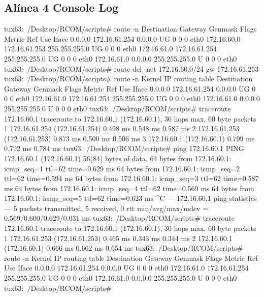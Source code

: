 \documentclass[11pt,a4paper,reqno]{report}
\numberwithin{equation}{section}
\begin{document}
\begin{appendices}
\subsection{Alínea 4 Console Log}
\label{ex4_redirect}
\begin{boxedverbatim}
tux63:~/Desktop/RCOM/scripts# route -n
Destination     Gateway         Genmask         Flags Metric Ref    Use Iface
0.0.0.0         172.16.61.254   0.0.0.0         UG    0      0        0 eth0
172.16.60.0     172.16.61.253   255.255.255.0   UG    0      0        0 eth0
172.16.61.0     172.16.61.254   255.255.255.0   UG    0      0        0 eth0
172.16.61.0     0.0.0.0         255.255.255.0   U     0      0        0 eth0
tux63:~/Desktop/RCOM/scripts# route del -net 172.16.60.0/24 gw 172.16.61.253
tux63:~/Desktop/RCOM/scripts# route -n
Kernel IP routing table
Destination     Gateway         Genmask         Flags Metric Ref    Use Iface
0.0.0.0         172.16.61.254   0.0.0.0         UG    0      0        0 eth0
172.16.61.0     172.16.61.254   255.255.255.0   UG    0      0        0 eth0
172.16.61.0     0.0.0.0         255.255.255.0   U     0      0        0 eth0
tux63:~/Desktop/RCOM/scripts# traceroute 172.16.60.1
traceroute to 172.16.60.1 (172.16.60.1), 30 hops max, 60 byte packets
 1  172.16.61.254 (172.16.61.254)  0.498 ms  0.548 ms  0.587 ms
 2  172.16.61.253 (172.16.61.253)  0.873 ms  0.500 ms  0.506 ms
 3  172.16.60.1 (172.16.60.1)  0.799 ms  0.792 ms  0.784 ms
tux63:~/Desktop/RCOM/scripts# ping 172.16.60.1
PING 172.16.60.1 (172.16.60.1) 56(84) bytes of data.
64 bytes from 172.16.60.1: icmp_seq=1 ttl=62 time=0.629 ms
64 bytes from 172.16.60.1: icmp_seq=2 ttl=62 time=0.594 ms
64 bytes from 172.16.60.1: icmp_seq=3 ttl=62 time=0.587 ms
64 bytes from 172.16.60.1: icmp_seq=4 ttl=62 time=0.569 ms
64 bytes from 172.16.60.1: icmp_seq=5 ttl=62 time=0.623 ms
^C
--- 172.16.60.1 ping statistics ---
5 packets transmitted, 5 received, 0%
rtt min/avg/max/mdev = 0.569/0.600/0.629/0.031 ms
tux63:~/Desktop/RCOM/scripts# traceroute 172.16.60.1
traceroute to 172.16.60.1 (172.16.60.1), 30 hops max, 60 byte packets
 1  172.16.61.253 (172.16.61.253)  0.465 ms  0.343 ms  0.344 ms
 2  172.16.60.1 (172.16.60.1)  0.666 ms  0.662 ms  0.654 ms
tux63:~/Desktop/RCOM/scripts# route -n
Kernel IP routing table
Destination     Gateway         Genmask         Flags Metric Ref    Use Iface
0.0.0.0         172.16.61.254   0.0.0.0         UG    0      0        0 eth0
172.16.61.0     172.16.61.254   255.255.255.0   UG    0      0        0 eth0
172.16.61.0     0.0.0.0         255.255.255.0   U     0      0        0 eth0
tux63:~/Desktop/RCOM/scripts# 
\end{boxedverbatim}


\end{appendices}
\end{document}
